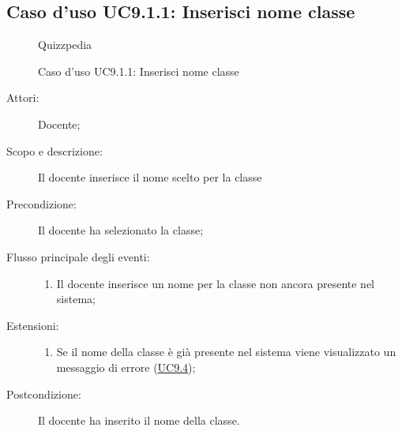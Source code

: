 \subsection{Caso d'uso UC9.1.1: Inserisci nome classe}
        \begin{figure}[H]
            \centering
            \begin{resizedtikzpicture}{\textwidth}
		\begin{umlsystem}[x=0, fill=lightgray!20]{Quizzpedia}
		\end{umlsystem}
            \end{resizedtikzpicture}
            \caption{Caso d'uso UC9.1.1: Inserisci nome classe}
            \label{fig:UC9.1.1} 
        \end{figure}
    \begin{description}
\item[Attori:] Docente;
\item[Scopo e descrizione:] Il docente inserisce il nome scelto per la classe
      \item[Precondizione:] Il docente ha selezionato la classe;

        \item[Flusso principale degli eventi:] \begin{enumerate}
          \item Il docente inserisce un nome per la classe non ancora presente nel sistema;

      \end{enumerate}
    \item[Estensioni:]
      \begin{enumerate}
          \item Se il nome della classe è già presente nel sistema viene visualizzato un messaggio di errore (\hyperlink{UC9.4}{UC9.4});

      \end{enumerate}
    \item[Postcondizione:] Il docente ha inserito il nome della classe.
  \end{description}
\hypertarget{UC9.1.2}{}
